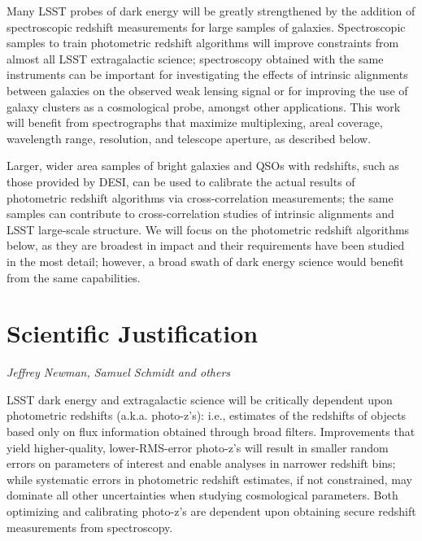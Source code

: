 
\label{chap:photoz}

Many LSST probes of dark energy will be greatly strengthened by the addition of spectroscopic redshift measurements for large samples of galaxies.  Spectroscopic samples to train photometric redshift algorithms will improve constraints from almost all LSST extragalactic science; spectroscopy obtained with the same instruments can be important for investigating the effects of intrinsic alignments between galaxies on the observed weak lensing signal or for improving the use of galaxy clusters as a cosmological probe, amongst other applications.  This work will benefit from spectrographs that maximize multiplexing, areal coverage, wavelength range, resolution, and telescope aperture, as described below.

Larger, wider area samples of bright galaxies and QSOs with redshifts, such as those provided by DESI, can be used to calibrate the actual results of photometric redshift algorithms via cross-correlation measurements; the same samples can contribute to cross-correlation studies of intrinsic alignments and LSST large-scale structure.  We will focus on the photometric redshift algorithms below, as they are broadest in impact and their requirements have been studied in the most detail; however, a broad swath of dark energy science would benefit from the same capabilities.

\section{Scientific Justification}
\label{sec:photoz_just}
{\it Jeffrey Newman, Samuel Schmidt and others}


LSST dark energy and extragalactic science will be critically dependent upon photometric redshifts (a.k.a. photo-z's): i.e., estimates of the redshifts of objects based only on flux information obtained through broad filters.  Improvements that yield higher-quality, lower-RMS-error photo-z's will result in smaller random errors on parameters of interest and enable analyses in narrower redshift bins; while systematic errors in photometric redshift estimates, if not constrained, may dominate all other uncertainties when studying cosmological parameters.  Both optimizing and calibrating photo-z's are dependent upon obtaining secure redshift measurements from spectroscopy.

